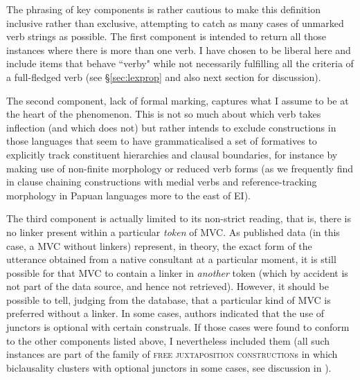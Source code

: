 The phrasing of key components is rather cautious to make this definition inclusive rather than exclusive, attempting to catch as many cases of unmarked verb strings as possible. The first component is intended to return all those instances where there is more than one verb. I have chosen to be liberal here and include items that behave ``verby" while not necessarily fulfilling all the criteria of a full-fledged verb (see §\ref{sec:lexprop} and also next section for discussion). 

The second component, lack of formal marking, captures what I assume to be at the heart of the phenomenon. This is not so much about which verb takes inflection (and which does not) but rather intends to exclude constructions in those languages that seem to have grammaticalised a set of formatives to explicitly track constituent hierarchies and clausal boundaries, for instance by making use of non-finite morphology or reduced verb forms (as we frequently find in clause chaining constructions with medial verbs and reference-tracking morphology in Papuan languages more to the east of EI). 

The third component is actually limited to its non-strict reading, that is, there is no linker present within a particular \emph{token} of MVC. As published data (in this case, a MVC without linkers) represent, in theory, the exact form of the utterance obtained from a native consultant at a particular moment, it is still possible for that MVC to contain a linker in \emph{another} token (which by accident is not part of the data source, and hence not retrieved). However, it should be possible to tell, judging from the database, that a particular kind of MVC is preferred without a linker. In some cases, authors indicated that the use of junctors is optional with certain construals. If those cases were found to conform to the other components listed above, I nevertheless included them (all such instances are part of the family of \textsc{free juxtaposition construction}s in which biclausality clusters with optional junctors in some cases, see discussion in ).

